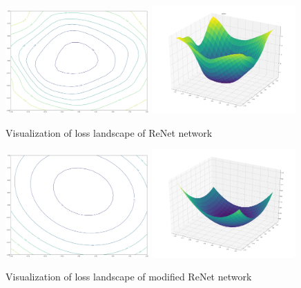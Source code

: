 \documentclass[a4paper, 10 pt, journal]{ieeeconf}
\begin{document}
\begin{figure}
\centering
	\includegraphics[width=0.49\textwidth]{img/loss_ReNet.png}
	\includegraphics[width=0.49\textwidth]{img/loss_3d_ReNet.png}
	\caption{Visualization of loss landscape of ReNet network}
	\label{fig:loss_ReNet}
\end{figure}

\begin{figure}
\centering
	\includegraphics[width=0.49\textwidth]{img/loss_modif_ReNet.png}
	\includegraphics[width=0.49\textwidth]{img/loss_3d_modif_ReNet.png}
	\caption{Visualization of loss landscape of modified ReNet network}
	\label{fig:loss_modif_ReNet}
\end{figure}
\end{document}
